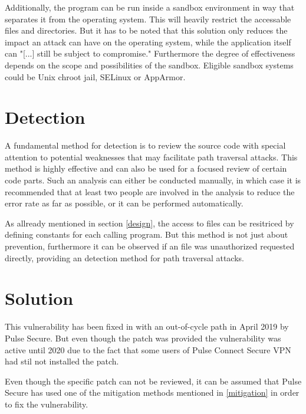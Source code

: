 Additionally, the program can be run inside a sandbox environment in way that separates it from the operating system. This will heavily restrict the accessable files and directories. But it has to be noted that this solution only reduces the impact an attack can have on the operating system, while the application itself can "[...] still be subject to compromise." \autocite{CWE22-Definition:online} Furthermore the degree of effectiveness depends on the scope and possibilities of the sandbox. Eligible sandbox systems could be Unix chroot jail, SELinux or AppArmor. \autocite{CWE22-Definition:online}

\section{Detection}
\label{detection}
A fundamental method for detection is to review the source code with special attention to potential weaknesses that may facilitate path traversal attacks. This method is highly effective and can also be used for a focused review of certain code parts. Such an analysis can either be conducted manually, in which case it is recommended that at least two people are involved in the analysis to reduce the error rate as far as possible, or it can be performed automatically.

As allready mentioned in section \ref{design}, the access to files can be resitriced by defining constants for each calling program. But this method is not just about prevention, furthermore it can be observed if an file was unauthorized requested directly, providing an detection method for path traversal attacks.

\section{Solution}
\label{solution}
This vulnerability has been fixed in with an out-of-cycle path in April 2019 by Pulse Secure. But even though the patch was provided the vulnerability was active until 2020 due to the fact that some users of Pulse Connect Secure VPN had stil not installed the patch.

Even though the specific patch can not be reviewed, it can be assumed that Pulse Secure has used one of the mitigation methods mentioned in \ref{mitigation} in order to fix the vulnerability.